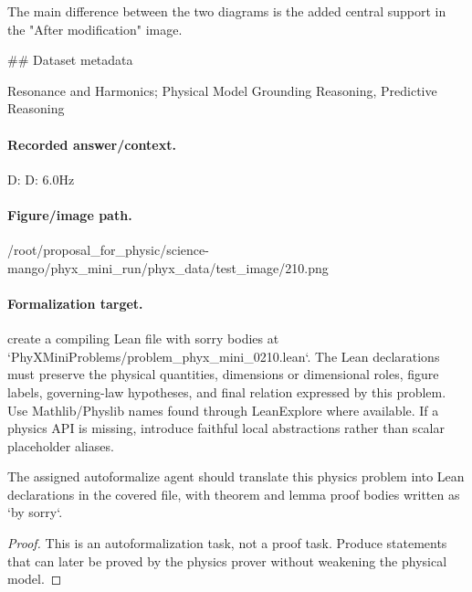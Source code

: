 The main difference between the two diagrams is the added central support in the "After modification" image.

\#\# Dataset metadata

Resonance and Harmonics; Physical Model Grounding Reasoning, Predictive Reasoning

\paragraph{Recorded answer/context.}
D: D: 6.0Hz

\paragraph{Figure/image path.}
/root/proposal\_for\_physic/science-mango/phyx\_mini\_run/phyx\_data/test\_image/210.png

\paragraph{Formalization target.}
create a compiling Lean file with sorry bodies at `PhyXMiniProblems/problem\_phyx\_mini\_0210.lean`. The Lean declarations must preserve the physical quantities, dimensions or dimensional roles, figure labels, governing-law hypotheses, and final relation expressed by this problem.
Use Mathlib/Physlib names found through LeanExplore where available. If a physics API is missing, introduce faithful local abstractions rather than scalar placeholder aliases.

\begin{theorem}
\label{thm:physics:phyx_mini_0210:target}
The assigned autoformalize agent should translate this physics problem into Lean declarations in the covered file, with theorem and lemma proof bodies written as `by sorry`.
\end{theorem}
\begin{proof}
This is an autoformalization task, not a proof task. Produce statements that can later be proved by the physics prover without weakening the physical model.
\end{proof}

